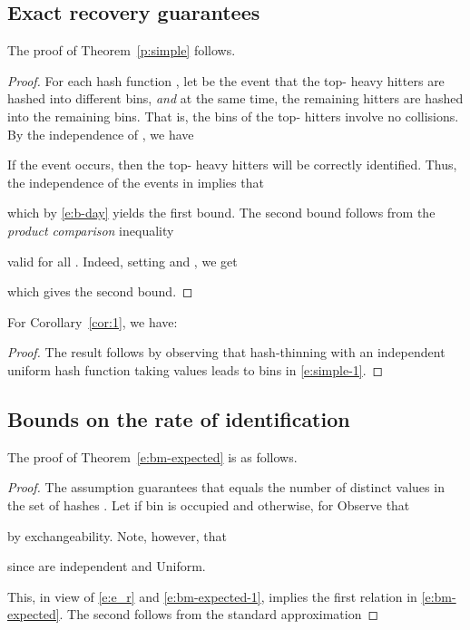 \documentclass[10pt, conference, letterpaper,onecolumn]{IEEEtranv1.8}
\theoremstyle{plain}\newtheorem{thm}{Theorem}\newtheorem{lem}{Lemma}
\theoremstyle{definition}
\begin{document}
\subsection{Exact recovery guarantees}


The proof of Theorem~\ref{p:simple} follows.

\begin{proof}
For each hash function , let  be the event that the top- heavy hitters are hashed into  different bins,
{\em and} at the same time, the remaining  hitters are hashed into the remaining  bins. That is, the bins of
the top- hitters involve no collisions.  By the independence of , we have

If the event  occurs, then the top- heavy hitters will be correctly identified. Thus, the
independence of the events  in  implies that 

which by \eqref{e:b-day} yields the first bound. The second bound follows from 
the {\em product comparison} inequality

valid for all . Indeed, setting  and , we get

which gives the second bound.
\end{proof}


For Corollary~\ref{cor:1}, we have:

\begin{proof}
The result follows by observing that hash-thinning with an independent uniform 
hash function  taking  values leads to  bins in \eqref{e:simple-1}.  
\end{proof}


\subsection{Bounds on the rate of identification}


The proof of Theorem~\ref{e:bm-expected} is as follows.

\begin{proof} The assumption  guarantees that 
 equals the number of distinct values in the set of hashes .
Let  if bin  is occupied and  otherwise, for  Observe that

by exchangeability. Note, however, that 

since  are independent and Uniform.

This, in view of \eqref{e:e_r} and \eqref{e:bm-expected-1}, implies 
the first relation in \eqref{e:bm-expected}. The second follows from the standard
approximation 
\end{proof}






\small
\balance


\end{document}
